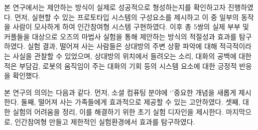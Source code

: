





본 연구에서는 제안하는 방식이 실제로  성공적으로 형성하는지를 확인하고자 \expUser\을 진행하였다. 먼저,  실현할 수 있는 프로토타입 시스템의 구성요소를 제시하고 이 중 일부의 동작을 사람이 모사하게 하여 인간참여형 시스템  구현하였다. 이후 총 5쌍의 실제 부부 및 커플들을 대상으로 오즈의 마법사 실험을 통해 제안하는 방식의 적절성과 효과를 탐구하였다. 실험 결과, 떨어져 사는 사람들은 상대방의 주변 상황 파악에 대해 적극적이라는 사실을 관찰할 수 있었으며, 상대방의 위치에서 들려오는 소리, 대화의 공백에 대한 적은 부담감, 로봇의 움직임이 주는 대화의 기회 등의 시스템 요소에 대한 긍정적 반응을 확인했다.



본 연구의 의의는 다음과 같다.
먼저, 소셜 컴퓨팅 분야에 `\concept' 중요한 개념을 새롭게 제시한다.
둘째, 떨어져 사는 가족들에게 \concept\을 효과적으로 제공할 수 있는 \approach\을 고안하였다.
셋째,  대한 실험의 어려움을 정리, 이를 해결하기 위한 초기 실험 디자인을 제시한다.
마지막으로, 인간참여형 \sysname\를 만들고 제한적인 실험환경에서  효과를 탐구하였다.


